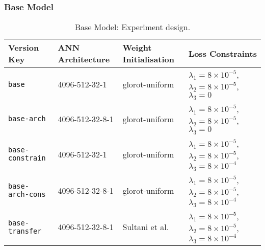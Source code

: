 \documentclass[sigplan,authorversion,nonacm, 9pt]{acmart}
\begin{document}
\subsubsection{Base Model}
\FloatBarrier
\begin{table*}[]
\begin{center}
\begin{tabular}{llll}
\hline
Version Key & ANN Architecture & Weight Initialisation                          & Loss Constraints \\ 
\hline
\texttt{base}                      & 4096-512-32-1    & glorot-uniform & $\lambda_1=8 \times 10^{-5}$, $\lambda_2=8 \times 10^{-5}$, $\lambda_3=0$  \\
\texttt{base-arch}                 & 4096-512-32-8-1  & glorot-uniform & $\lambda_1=8 \times 10^{-5}$, $\lambda_2=8 \times 10^{-5}$, $\lambda_3=0$ \\
\texttt{base-constrain}            & 4096-512-32-1    & glorot-uniform & $\lambda_1=8 \times 10^{-5}$, $\lambda_2=8 \times 10^{-5}$, $\lambda_3=8 \times 10^{-4}$  \\
\texttt{base-arch-cons}            & 4096-512-32-8-1  & glorot-uniform & $\lambda_1=8 \times 10^{-5}$, $\lambda_2=8 \times 10^{-5}$, $\lambda_3=8 \times 10^{-4}$ \\
\texttt{base-transfer}             & 4096-512-32-8-1  & Sultani et al. \cite{sultani} & $\lambda_1=8 \times 10^{-5}$, $\lambda_2=8 \times 10^{-5}$, $\lambda_3=8 \times 10^{-4}$ \\

\end{tabular}
\end{center}
\caption{Base Model: Experiment design.}

\label{tab:expdesign}
\end{table*}
\end{document}
